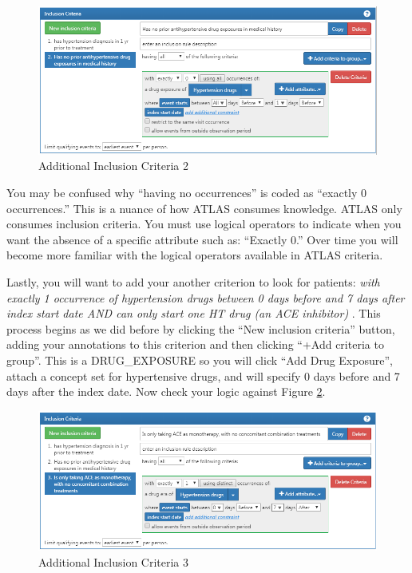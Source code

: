 \documentclass[11pt]{book}
\theoremstyle{definition}
\theoremstyle{definition}
\theoremstyle{definition}
\theoremstyle{remark}
\begin{document}
\begin{figure}

{\centering \includegraphics[width=1\linewidth]{images/Cohorts/ATLAS-IC2} 

}

\caption{Additional Inclusion Criteria 2}\label{fig:ATLASIC2}
\end{figure}

You may be confused why ``having no occurrences'' is coded as ``exactly
0 occurrences.'' This is a nuance of how ATLAS consumes knowledge. ATLAS
only consumes inclusion criteria. You must use logical operators to
indicate when you want the absence of a specific attribute such as:
``Exactly 0.'' Over time you will become more familiar with the logical
operators available in ATLAS criteria.

Lastly, you will want to add your another criterion to look for
patients: \emph{with exactly 1 occurrence of hypertension drugs between
0 days before and 7 days after index start date AND can only start one
HT drug (an ACE inhibitor)} . This process begins as we did before by
clicking the ``New inclusion criteria'' button, adding your annotations
to this criterion and then clicking ``+Add criteria to group''. This is
a DRUG\_EXPOSURE so you will click ``Add Drug Exposure'', attach a
concept set for hypertensive drugs, and will specify 0 days before and 7
days after the index date. Now check your logic against Figure
\ref{fig:ATLASIC3}.

\begin{figure}

{\centering \includegraphics[width=1\linewidth]{images/Cohorts/ATLAS-IC3} 

}

\caption{Additional Inclusion Criteria 3}\label{fig:ATLASIC3}
\end{figure}
\end{document}
